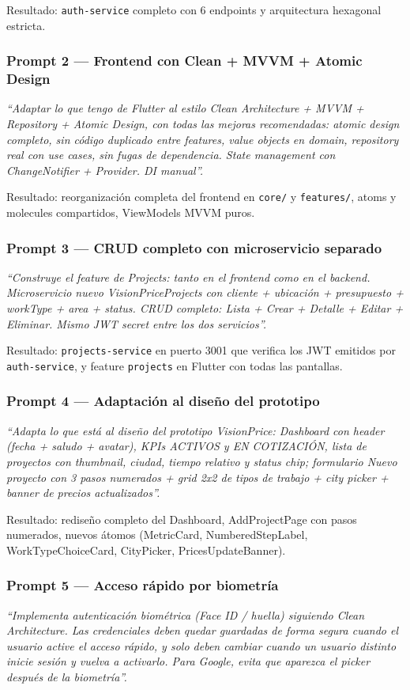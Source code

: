 \documentclass[12pt, a4paper]{article} %
\begin{document}
Resultado: \texttt{auth-service} completo con 6 endpoints y arquitectura
hexagonal estricta.

\subsubsection{Prompt 2 — Frontend con Clean + MVVM + Atomic Design}
\textit{``Adaptar lo que tengo de Flutter al estilo Clean Architecture +
MVVM + Repository + Atomic Design, con todas las mejoras recomendadas:
atomic design completo, sin código duplicado entre features, value
objects en domain, repository real con use cases, sin fugas de
dependencia. State management con ChangeNotifier + Provider. DI
manual''.}

Resultado: reorganización completa del frontend en \texttt{core/} y
\texttt{features/}, atoms y molecules compartidos, ViewModels MVVM
puros.

\subsubsection{Prompt 3 — CRUD completo con microservicio separado}
\textit{``Construye el feature de Projects: tanto en el frontend como en
el backend. Microservicio nuevo VisionPriceProjects con cliente +
ubicación + presupuesto + workType + area + status. CRUD completo: Lista
+ Crear + Detalle + Editar + Eliminar. Mismo JWT secret entre los dos
servicios''.}

Resultado: \texttt{projects-service} en puerto 3001 que verifica los
JWT emitidos por \texttt{auth-service}, y feature \texttt{projects} en
Flutter con todas las pantallas.

\subsubsection{Prompt 4 — Adaptación al diseño del prototipo}
\textit{``Adapta lo que está al diseño del prototipo VisionPrice:
Dashboard con header (fecha + saludo + avatar), KPIs ACTIVOS y EN
COTIZACIÓN, lista de proyectos con thumbnail, ciudad, tiempo relativo y
status chip; formulario Nuevo proyecto con 3 pasos numerados + grid 2x2
de tipos de trabajo + city picker + banner de precios actualizados''.}

Resultado: rediseño completo del Dashboard, AddProjectPage con pasos
numerados, nuevos átomos (MetricCard, NumberedStepLabel,
WorkTypeChoiceCard, CityPicker, PricesUpdateBanner).

\subsubsection{Prompt 5 — Acceso rápido por biometría}
\textit{``Implementa autenticación biométrica (Face ID / huella) siguiendo
Clean Architecture. Las credenciales deben quedar guardadas de forma
segura cuando el usuario active el acceso rápido, y solo deben cambiar
cuando un usuario distinto inicie sesión y vuelva a activarlo. Para
Google, evita que aparezca el picker después de la biometría''.}
\end{document}
